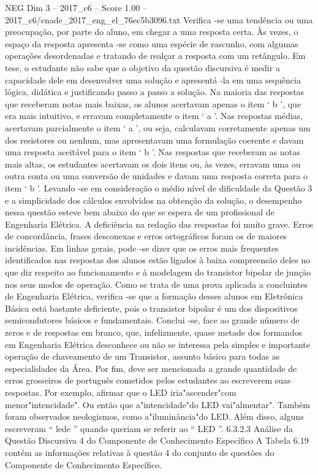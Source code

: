 \begin{textsample}{NEG Dim 3 – 2017\_c6 – Score 1.00 – 2017\_c6/enade\_2017\_eng\_el\_76ec5b3096.txt}
Verifica -se uma tendência ou uma preocupação, por parte do aluno, em chegar a uma resposta certa.
Às vezes, o espaço da resposta apresenta -se como uma espécie de rascunho, com algumas operações desordenadas e tratando de realçar a resposta com um retângulo.
Em tese, o estudante não sabe que o objetivo da questão discursiva é medir a capacidade dele em desenvolver uma solução e apresentá -la em uma sequência lógica, didática e justificando passo a passo a solução.
Na maioria das respostas que receberam notas mais baixas, os alunos acertavam apenas o item ‘ b ’, que era mais intuitivo, e erravam completamente o item ‘ a ’.
Nas respostas médias, acertavam parcialmente o item ‘ a ’, ou seja, calculavam corretamente apenas um dos resistores ou nenhum, mas apresentavam uma formulação coerente e davam uma resposta aceitável para o item ‘ b ’.
Nas respostas que receberam as notas mais altas, os estudantes acertavam os dois itens ou, às vezes, erravam uma ou outra conta ou uma conversão de unidades e davam uma resposta correta para o item ‘ b ’.
Levando -se em consideração o médio nível de dificuldade da Questão 3 e a simplicidade dos cálculos envolvidos na obtenção da solução, o desempenho nessa questão esteve bem abaixo do que se espera de um profissional de Engenharia Elétrica.
A deficiência na redação das respostas foi muito grave.
Erros de concordância, frases desconexas e erros ortográficos foram os de maiores incidências.
Em linhas gerais, pode -se dizer que os erros mais frequentes identificados nas respostas dos alunos estão ligados à baixa compreensão deles no que diz respeito ao funcionamento e à modelagem do transistor bipolar de junção nos seus modos de operação.
Como se trata de uma prova aplicada a concluintes de Engenharia Elétrica, verifica -se que a formação desses alunos em Eletrônica Básica está bastante deficiente, pois o transistor bipolar é um dos dispositivos semicondutores básicos e fundamentais.
Conclui -se, face ao grande número de zeros e de respostas em branco, que, infelizmente, quase metade dos formandos em Engenharia Elétrica desconhece ou não se interessa pela simples e importante operação de chaveamento de um Transistor, assunto básico para todas as especialidades da Área.
Por fim, deve ser mencionada a grande quantidade de erros grosseiros de português cometidos pelos estudantes ao escreverem suas respostas.
Por exemplo, afirmar que o LED iria"ascender"com menor"intencidade".
Ou então que a"intencidade"do LED vai"almentar".
Também foram observados neologismos, como a"iluminância"do LED.
Além disso, alguns escreveram “ lede ” quando queriam se referir ao “ LED ”. 6.3.2.3 Análise da Questão Discursiva 4 do Componente de Conhecimento Específico A Tabela 6.19 contém as informações relativas à questão 4 do conjunto de questões do Componente de Conhecimento Específico.

\end{textsample}
